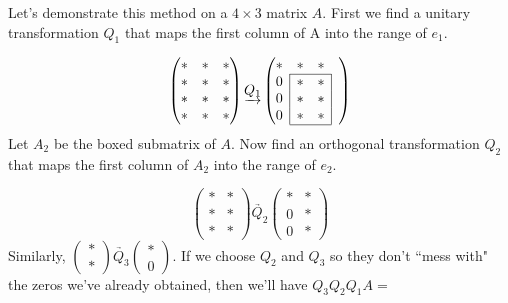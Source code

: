Let's demonstrate this method on a $4 \times 3$ matrix $A$. First we find a unitary transformation $Q_1$ that maps the first column of A into the range of $e_1$.

\def\mc#1{\multicolumn{1}{c|}{#1}}
\begin{equation*}
\begin{pmatrix}
\ast & \ast & \ast \\
\ast & \ast & \ast \\
\ast & \ast & \ast \\
\ast & \ast & \ast 
\end{pmatrix}
\underrightarrow{Q_1}
\begin{pmatrix}

\ast & \ast & \ast & \\ \cline{2-3}
\mc{0} & \ast & \mc{\ast}& \\
\mc{0} & \ast & \mc{\ast} & \\
\mc{0}& \ast & \mc{\ast} & \\ \cline{2-3}
\end{pmatrix}
\end{equation*}
Let $A_2$ be the boxed submatrix of $A$. Now find an orthogonal transformation $Q_2$ that maps the first column of $A_2$ into the range of $e_2$. 

\begin{equation*}
\begin{pmatrix}
\ast & \ast \\
\ast & \ast \\
\ast & \ast 
\end{pmatrix}
\underrightarrow{Q_2}
\begin{pmatrix}
\ast & \ast \\
0 & \ast \\
0 & \ast 
\end{pmatrix}
\end{equation*}
Similarly, $ \begin{pmatrix} \ast \\ \ast \end{pmatrix} \underrightarrow{Q_3} \begin{pmatrix} \ast \\ 0 \end{pmatrix} $. If we choose $Q_2$ and $Q_3$ so they don't ``mess with" the zeros we've already obtained, then we'll have $Q_3 Q_2 Q_1 A =$ 

